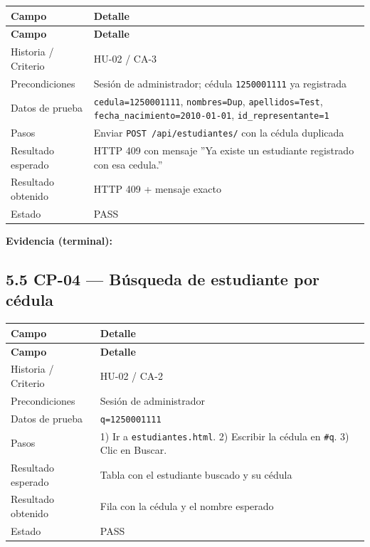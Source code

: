 \documentclass[11pt,a4paper]{article}
\begin{document}
{\small
\begin{longtable}{|p{}|p{}|}
\rowcolor{UTECblue}\color{white}\bfseries Campo & \color{white}\bfseries Detalle \\ \hline
\endfirsthead
\rowcolor{UTECblue}\color{white}\bfseries Campo & \color{white}\bfseries Detalle \\ \hline
\endhead
Historia / Criterio & HU-02 / CA-3 \\ \hline
Precondiciones & Sesión de administrador; cédula \texttt{1250001111} ya registrada \\ \hline
Datos de prueba & \texttt{cedula=1250001111}, \texttt{nombres=Dup}, \texttt{apellidos=Test}, \texttt{fecha\_nacimiento=2010-01-01}, \texttt{id\_representante=1} \\ \hline
Pasos & Enviar \texttt{POST /api/estudiantes/} con la cédula duplicada \\ \hline
Resultado esperado & HTTP 409 con mensaje ''Ya existe un estudiante registrado con esa cedula.'' \\ \hline
Resultado obtenido & HTTP 409 + mensaje exacto \\ \hline
Estado & {\color{green!60!black}{$\checkmark$}} PASS \\ \hline
\end{longtable}}


\textbf{Evidencia (terminal):}


\subsection*{5.5 CP-04 --- Búsqueda de estudiante por cédula}


{\small
\begin{longtable}{|p{}|p{}|}
\rowcolor{UTECblue}\color{white}\bfseries Campo & \color{white}\bfseries Detalle \\ \hline
\endfirsthead
\rowcolor{UTECblue}\color{white}\bfseries Campo & \color{white}\bfseries Detalle \\ \hline
\endhead
Historia / Criterio & HU-02 / CA-2 \\ \hline
Precondiciones & Sesión de administrador \\ \hline
Datos de prueba & \texttt{q=1250001111} \\ \hline
Pasos & 1) Ir a \texttt{estudiantes.html}. 2) Escribir la cédula en \texttt{\#q}. 3) Clic en Buscar. \\ \hline
Resultado esperado & Tabla con el estudiante buscado y su cédula \\ \hline
Resultado obtenido & Fila con la cédula y el nombre esperado \\ \hline
Estado & {\color{green!60!black}{$\checkmark$}} PASS \\ \hline
\end{longtable}}
\end{document}
